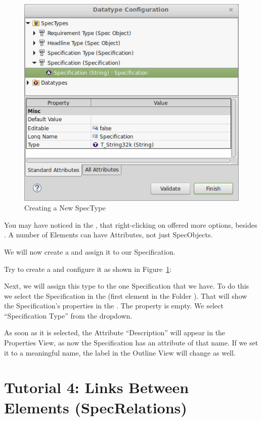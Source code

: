 \begin{figure}
\centering      
\includegraphics[width=0.8\linewidth]{../rmf-images/new_spectype.png}      
\caption{Creating a New SpecType}      
\label{fig:newSpecType}
\end{figure}

You may have noticed in the , that right-clicking on  offered more options, besides .  A number of Elements can have Attributes, not just SpecObjects.

We will now create a  and assign it to our Specification.

Try to create a  and configure it as shown in Figure~\ref{fig:newSpecType}:

Next, we will assign this type to the one Specification that we have.  To do this we select the Specification in the  (first element in the Folder ).  That will show
the Specification's properties in the .  The  property is empty.  We select ``Specification Type'' from the dropdown.

As soon as it is selected, the Attribute ``Description'' will appear in the Properties View, as now the Specification has an attribute of that name.  If we set it to a meaningful name, the label in the Outline View will change as well.

\section{Tutorial 4: Links Between Elements (SpecRelations)}

